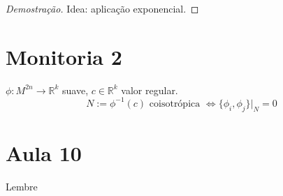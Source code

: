 \begin{proof}[Demostra\c c\~ao]
	Idea: aplica\c c\~ao exponencial.
\end{proof}

\section{Monitoria 2}

\begin{prop}
	$\phi:M^{2n}\to \mathbb{R}^{k}$ suave, $c \in\mathbb{R}^{k}$ valor regular.
	 \[N:=\phi^{-1}(c) \text{ coisotr\'opica }\iff \{\phi_i,\phi_j\} |_{N}=0 \]
\end{prop}


\section{Aula 10}

Lembre

